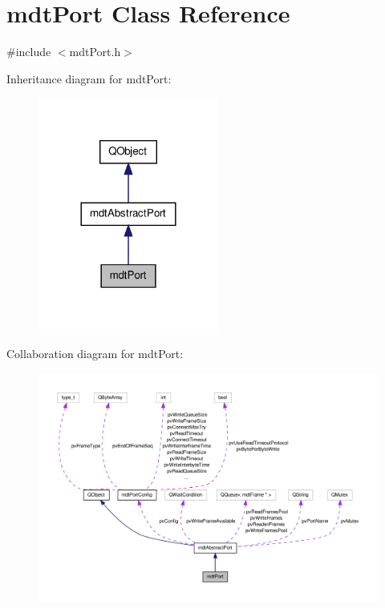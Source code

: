 \hypertarget{classmdt_port}{\section{mdt\-Port Class Reference}
\label{classmdt_port}
}


{\ttfamily \#include $<$mdt\-Port.\-h$>$}



Inheritance diagram for mdt\-Port\-:\nopagebreak
\begin{figure}[H]
\begin{center}
\leavevmode
\includegraphics[width=168pt]{classmdt_port__inherit__graph}
\end{center}
\end{figure}


Collaboration diagram for mdt\-Port\-:\nopagebreak
\begin{figure}[H]
\begin{center}
\leavevmode
\includegraphics[width=350pt]{classmdt_port__coll__graph}
\end{center}
\end{figure}
